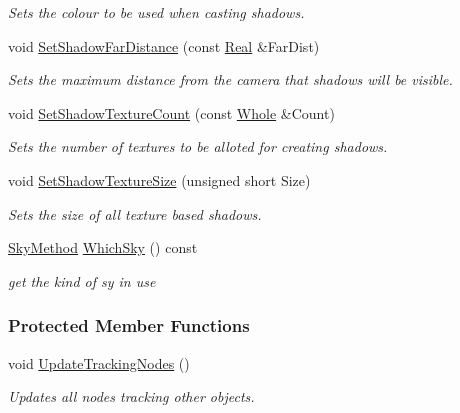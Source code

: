 \begin{DoxyCompactItemize}
\begin{DoxyCompactList}\small\item\em Sets the colour to be used when casting shadows. \item\end{DoxyCompactList}\item 
void \hyperlink{classMezzanine_1_1SceneManager_a79b5c4f2edd3301134a6a2513b4deaa1}{SetShadowFarDistance} (const \hyperlink{namespaceMezzanine_a726731b1a7df72bf3583e4a97282c6f6}{Real} \&FarDist)
\begin{DoxyCompactList}\small\item\em Sets the maximum distance from the camera that shadows will be visible. \item\end{DoxyCompactList}\item 
void \hyperlink{classMezzanine_1_1SceneManager_a9d959f0128e2aa14aeb9d425cd9631d2}{SetShadowTextureCount} (const \hyperlink{namespaceMezzanine_adcbb6ce6d1eb4379d109e51171e2e493}{Whole} \&Count)
\begin{DoxyCompactList}\small\item\em Sets the number of textures to be alloted for creating shadows. \item\end{DoxyCompactList}\item 
void \hyperlink{classMezzanine_1_1SceneManager_a303b871aa1475605d2711239d4d088ac}{SetShadowTextureSize} (unsigned short Size)
\begin{DoxyCompactList}\small\item\em Sets the size of all texture based shadows. \item\end{DoxyCompactList}\item 
\hyperlink{classMezzanine_1_1SceneManager_a80fac0c0b67191cb5450bddde74b470e}{SkyMethod} \hyperlink{classMezzanine_1_1SceneManager_a53459adabe43b627fae6c1cdad5094f6}{WhichSky} () const 
\begin{DoxyCompactList}\small\item\em get the kind of sy in use \item\end{DoxyCompactList}\end{DoxyCompactItemize}
\subsubsection*{Protected Member Functions}
\begin{DoxyCompactItemize}
\item 
\hypertarget{classMezzanine_1_1SceneManager_a7263baed88ec60edbffdcaa12ccec53f}{
void \hyperlink{classMezzanine_1_1SceneManager_a7263baed88ec60edbffdcaa12ccec53f}{UpdateTrackingNodes} ()}
\label{classMezzanine_1_1SceneManager_a7263baed88ec60edbffdcaa12ccec53f}

\begin{DoxyCompactList}\small\item\em Updates all nodes tracking other objects. \item\end{DoxyCompactList}\end{DoxyCompactItemize}
